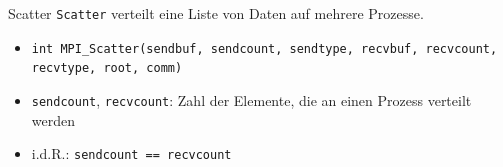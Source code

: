 \documentclass{beamer}
\begin{document}
\begin{frame}{Scatter}
	\texttt{Scatter} verteilt eine Liste von Daten auf mehrere Prozesse.

	\begin{figure}
	\end{figure}

	\begin{itemize}
		\item {\footnotesize \texttt{int MPI_Scatter(sendbuf, sendcount, sendtype, recvbuf, recvcount, recvtype, root, comm)}}
		\item \texttt{sendcount}, \texttt{recvcount}: Zahl der Elemente, die an einen Prozess verteilt werden
		\item i.d.R.: \texttt{sendcount == recvcount}
	\end{itemize}
\end{frame}
\end{document}
